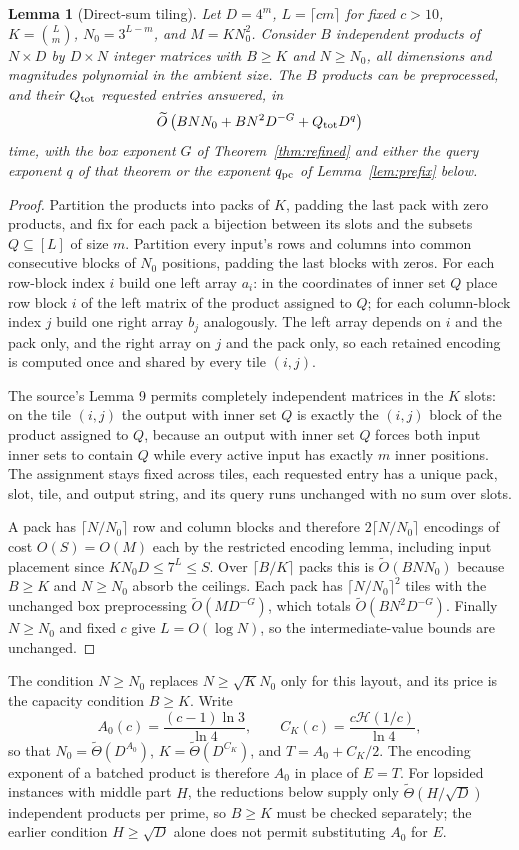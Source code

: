 \documentclass[11pt]{article}
\newtheorem{lemma}[theorem]{Lemma}
\newcommand{\softO}{\widetilde O}
\newcommand{\HH}{\mathcal H}
\begin{document}
\begin{lemma}[Direct-sum tiling]
\label{lem:direct-sum}
Let $D=4^m$, $L=\lceil cm\rceil$ for fixed $c>10$, $K=\binom Lm$,
$N_0=3^{L-m}$, and $M=KN_0^2$. Consider $B$ independent products of
$N\times D$ by $D\times N$ integer matrices with $B\ge K$ and $N\ge N_0$, all
dimensions and magnitudes polynomial in the ambient size. The $B$ products
can be preprocessed, and their $Q_{\rm tot}$ requested entries answered, in
\[
\softO\left(BNN_0+BN^2D^{-G}+Q_{\rm tot}D^{q}\right)
\]
time, with the box exponent $G$ of Theorem~\ref{thm:refined} and either the
query exponent $q$ of that theorem or the exponent $q_{\rm pc}$ of
Lemma~\ref{lem:prefix} below.
\end{lemma}
\begin{proof}
Partition the products into packs of $K$, padding the last pack with zero
products, and fix for each pack a bijection between its slots and the
subsets $Q\subseteq[L]$ of size $m$. Partition every input's rows and
columns into common consecutive blocks of $N_0$ positions, padding the last
blocks with zeros. For each row-block index $i$ build one left array $a_i$:
in the coordinates of inner set $Q$ place row block $i$ of the left matrix
of the product assigned to $Q$; for each column-block index $j$ build one
right array $b_j$ analogously. The left array depends on $i$ and the pack
only, and the right array on $j$ and the pack only, so each retained
encoding is computed once and shared by every tile $(i,j)$.

The source's Lemma 9 permits completely independent matrices in the $K$
slots: on the tile $(i,j)$ the output with inner set $Q$ is exactly the
$(i,j)$ block of the product assigned to $Q$, because an output with inner
set $Q$ forces both input inner sets to contain $Q$ while every active input
has exactly $m$ inner positions. The assignment stays fixed across tiles,
each requested entry has a unique pack, slot, tile, and output string, and
its query runs unchanged with no sum over slots.

A pack has $\lceil N/N_0\rceil$ row and column blocks and therefore
$2\lceil N/N_0\rceil$ encodings of cost $O(S)=O(M)$ each by the restricted
encoding lemma, including input placement since $KN_0D\le7^L\le S$. Over
$\lceil B/K\rceil$ packs this is $\softO(BNN_0)$ because $B\ge K$ and
$N\ge N_0$ absorb the ceilings. Each pack has $\lceil N/N_0\rceil^2$ tiles
with the unchanged box preprocessing $\softO(MD^{-G})$, which totals
$\softO(BN^2D^{-G})$. Finally $N\ge N_0$ and fixed $c$ give $L=O(\log N)$,
so the intermediate-value bounds are unchanged.
\end{proof}
The condition $N\ge N_0$ replaces $N\ge\sqrt KN_0$ only for this layout, and
its price is the capacity condition $B\ge K$. Write
\[
A_0(c)=\frac{(c-1)\ln3}{\ln4},\qquad C_K(c)=\frac{c\HH(1/c)}{\ln4},
\]
so that $N_0=\widetilde\Theta(D^{A_0})$, $K=\widetilde\Theta(D^{C_K})$, and
$T=A_0+C_K/2$. The encoding exponent of a batched product is therefore
$A_0$ in place of $E=T$. For lopsided instances with middle part $H$, the
reductions below supply only $\widetilde\Theta(H/\sqrt D)$ independent
products per prime, so $B\ge K$ must be checked separately; the earlier
condition $H\ge\sqrt D$ alone does not permit substituting $A_0$ for $E$.
\end{document}
